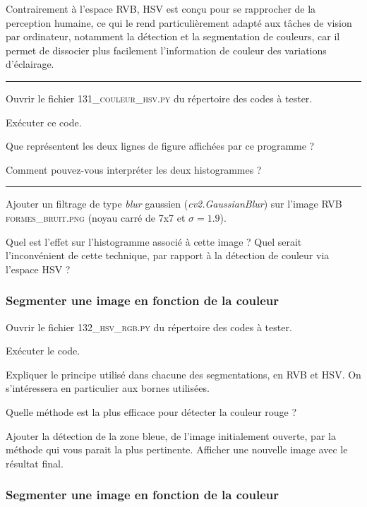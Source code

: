 \documentclass[a4paper,12pt,titlepage]{article} %
\begin{document}
\medskip

Contrairement à l'espace RVB, HSV est conçu pour se rapprocher de la perception humaine, ce qui le rend particulièrement adapté aux tâches de vision par ordinateur, notamment la détection et la segmentation de couleurs, car il permet de dissocier plus facilement l'information de couleur des variations d'éclairage.

\noindent \rule{\linewidth}{1pt}

\Manip Ouvrir le fichier \textsc{131\_couleur\_hsv.py} du répertoire des codes à tester.

\Manip Exécuter ce code.

\Quest Que représentent les deux lignes de figure affichées par ce programme ?

\Quest Comment pouvez-vous interpréter les deux histogrammes ?

\noindent \rule{\linewidth}{1pt}

\Manip Ajouter un filtrage de type \textit{blur} gaussien (\textit{cv2.GaussianBlur}) sur l'image RVB \textsc{formes\_bruit.png} (noyau carré de 7x7 et $\sigma = 1.9$).

\Quest Quel est l'effet sur l'histogramme associé à cette image ? Quel serait l'inconvénient de cette technique, par rapport à la détection de couleur via l'espace HSV ?

\subsubsection{Segmenter une image en fonction de la couleur}

\Manip Ouvrir le fichier \textsc{132\_hsv\_rgb.py} du répertoire des codes à tester.

\Manip Exécuter le code.

\Quest Expliquer le principe utilisé dans chacune des segmentations, en RVB et HSV. On s'intéressera en particulier aux bornes utilisées.

\Quest Quelle méthode est la plus efficace pour détecter la couleur rouge ?

\Manip Ajouter la détection de la zone bleue, de l'image initialement ouverte, par la méthode qui vous parait la plus pertinente. Afficher une nouvelle image avec le résultat final.


\subsubsection{Segmenter une image en fonction de la couleur}
\end{document}
